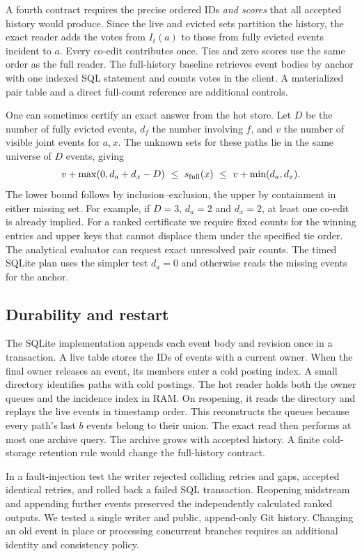 \documentclass[conference]{IEEEtran}
\begin{document}
A fourth contract requires the precise ordered IDs \emph{and scores} that all accepted history would produce. Since the live and evicted sets partition the history, the exact reader adds the votes from $I_t(a)$ to those from fully evicted events incident to $a$. Every co-edit contributes once. Ties and zero scores use the same order as the full reader. The full-history baseline retrieves event bodies by anchor with one indexed SQL statement and counts votes in the client. A materialized pair table and a direct full-count reference are additional controls.

One can sometimes certify an exact answer from the hot store. Let $D$ be the number of fully evicted events, $d_f$ the number involving $f$, and $v$ the number of visible joint events for $a,x$. The unknown sets for these paths lie in the same universe of $D$ events, giving
\[
v+\max(0,d_a+d_x-D)\ \le\ s_{\rm full}(x)\
\le\ v+\min(d_a,d_x).
\]
The lower bound follows by inclusion--exclusion, the upper by containment in either missing set. For example, if $D=3$, $d_a=2$ and $d_x=2$, at least one co-edit is already implied. For a ranked certificate we require fixed counts for the winning entries and upper keys that cannot displace them under the specified tie order. The analytical evaluator can request exact unresolved pair counts. The timed SQLite plan uses the simpler test $d_a=0$ and otherwise reads the missing events for the anchor.

\subsection{Durability and restart}
The SQLite implementation appends each event body and revision once in a transaction. A live table stores the IDs of events with a current owner. When the final owner releases an event, its members enter a cold posting index. A small directory identifies paths with cold postings. The hot reader holds both the owner queues and the incidence index in RAM. On reopening, it reads the directory and replays the live events in timestamp order. This reconstructs the queues because every path's last $b$ events belong to their union. The exact read then performs at most one archive query. The archive grows with accepted history. A finite cold-storage retention rule would change the full-history contract.

In a fault-injection test the writer rejected colliding retries and gaps, accepted identical retries, and rolled back a failed SQL transaction. Reopening midstream and appending further events preserved the independently calculated ranked outputs. We tested a single writer and public, append-only Git history. Changing an old event in place or processing concurrent branches requires an additional identity and consistency policy.
\end{document}

